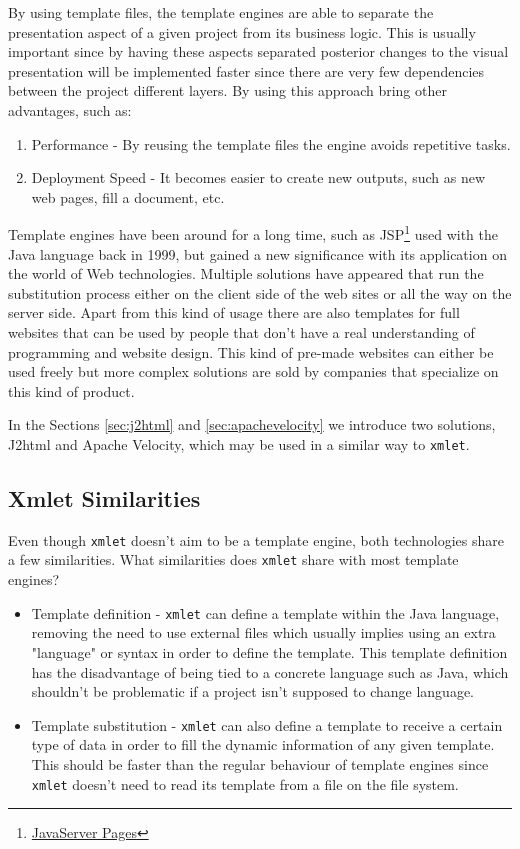 \noindent
By using template files, the template engines are able to separate the presentation aspect of a given project from its business logic. This is usually important since by having these aspects separated posterior changes to the visual presentation will be implemented faster since there are very few dependencies between the project different layers. By using this approach bring other advantages, such as:

\begin{enumerate}
\item Performance - By reusing the template files the engine avoids repetitive tasks.
\item Deployment Speed - It becomes easier to create new outputs, such as new web pages, fill a document, etc.
\end{enumerate}

\noindent
Template engines have been around for a long time, such as \ac{JSP}\footnote{\href{http://www.oracle.com/technetwork/java/javaee/jsp/index.html} {JavaServer Pages}} used with the Java language back in 1999, but gained a new significance with its application on the world of Web technologies. Multiple solutions have appeared that run the substitution process either on the client side of the web sites or all the way on the server side. Apart from this kind of usage there are also templates for full websites that  can be used by people that don't have a real understanding of programming and website design. This kind of pre-made websites can either be used freely but more complex solutions are sold by companies that specialize on this kind of product. 

\noindent
In the Sections \ref{sec:j2html} and \ref{sec:apachevelocity} we introduce two solutions, J2html and Apache Velocity, which may be used in a similar way to \texttt{xmlet}.

\subsection{Xmlet Similarities}
\label{sec:similarities}

Even though \texttt{xmlet} doesn't aim to be a template engine, both technologies share a few similarities. What similarities does \texttt{xmlet} share with most template engines?

\begin{itemize}
	\item Template definition - \texttt{xmlet} can define a template within the Java language, removing the need to use external files which usually implies using an extra "language" or syntax in order to define the template. This template definition has the disadvantage of being tied to a concrete language such as Java, which shouldn't be problematic if a project isn't supposed to change language. 
	\item Template substitution - \texttt{xmlet} can also define a template to receive a certain type of data in order to fill the dynamic information of any given template. This should be faster than the regular behaviour of template engines since \texttt{xmlet} doesn't need to read its template from a file on the file system.
\end{itemize}

